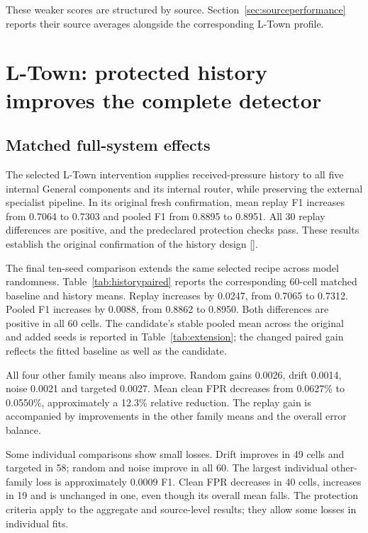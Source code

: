 These weaker scores are structured by source. Section~\ref{sec:sourceperformance} reports their source averages alongside the corresponding L-Town profile.

\section{L-Town: protected history improves the complete detector}
\subsection{Matched full-system effects}
The selected L-Town intervention supplies received-pressure history to all five internal General components and its internal router, while preserving the external specialist pipeline. In its original fresh confirmation, mean replay F1 increases from 0.7064 to 0.7303 and pooled F1 from 0.8895 to 0.8951. All 30 replay differences are positive, and the predeclared protection checks pass. These results establish the original confirmation of the history design [].

The final ten-seed comparison extends the same selected recipe across model randomness. Table~\ref{tab:historypaired} reports the corresponding 60-cell matched baseline and history means. Replay increases by 0.0247, from 0.7065 to 0.7312. Pooled F1 increases by 0.0088, from 0.8862 to 0.8950. Both differences are positive in all 60 cells. The candidate's stable pooled mean across the original and added seeds is reported in Table~\ref{tab:extension}; the changed paired gain reflects the fitted baseline as well as the candidate.



All four other family means also improve. Random gains 0.0026, drift 0.0014, noise 0.0021 and targeted 0.0027. Mean clean FPR decreases from 0.0627\% to 0.0550\%, approximately a 12.3\% relative reduction. The replay gain is accompanied by improvements in the other family means and the overall error balance.

Some individual comparisons show small losses. Drift improves in 49 cells and targeted in 58; random and noise improve in all 60. The largest individual other-family loss is approximately 0.0009 F1. Clean FPR decreases in 40 cells, increases in 19 and is unchanged in one, even though its overall mean falls. The protection criteria apply to the aggregate and source-level results; they allow some losses in individual fits.

